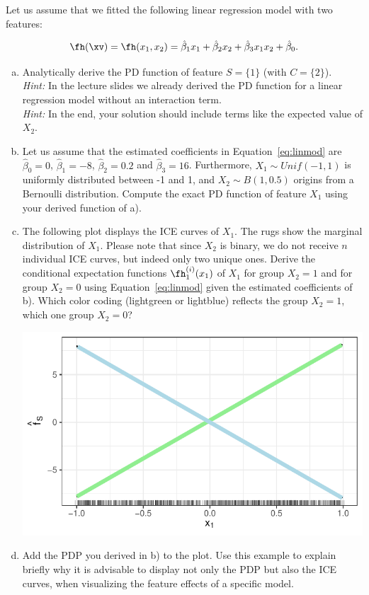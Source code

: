 Let us assume that we fitted the following linear regression model with two features: 

\begin{equation}
  \fh(\xv) = \fh(x_1, x_2) = \hat\beta_1 x_1 + \hat\beta_2 x_2 + \hat\beta_3 x_1 x_2 + \hat\beta_0.
  \label{eq:linmod}
\end{equation}


\begin{enumerate}[a)]
  \item Analytically derive the PD function of feature $S = \{1\}$ (with $C = \{2\}$).\\
  \textit{Hint:} In the lecture slides we already derived the PD function for a
  linear regression model without an interaction term.\\
  \textit{Hint:} In the end, your solution should include terms like the expected value of $X_2$.
  \item Let us assume that the estimated coefficients in Equation~\ref{eq:linmod}
  are $\hat\beta_0 = 0$, $\hat\beta_1 = -8$, $\hat\beta_2 = 0.2$ and $\hat\beta_3 = 16$.
  Furthermore, $X_1 \sim Unif(-1, 1)$ is uniformly distributed between -1 and 1, 
  and $X_2 \sim B(1, 0.5)$ origins from a Bernoulli distribution. 
  Compute the exact PD function of feature $X_1$ using your derived function of a).
  \item The following plot displays the ICE curves of $X_1$. The rugs show the marginal distribution of $X_1$. 
  Please note that since $X_2$ is binary, we do not receive $n$ individual ICE curves, but indeed 
  only two unique ones. 
  Derive the conditional expectation functions $\fh_1^{(i)}(x_1)$ of $X_1$ for group $X_2 = 1$ and for group $X_2 = 0$ using Equation~\ref{eq:linmod} given the estimated coefficients of b). 
  Which color coding (lightgreen or lightblue) reflects the group $X_2 = 1$, which one group $X_2 = 0$?

\begin{center}
\begin{knitrout}
\color{fgcolor}
\includegraphics[width=\maxwidth]{figure/fig-1-ex-pdpinteractions-1} 
\end{knitrout}
\end{center}

\item Add the PDP you derived in b) to the plot. 
  Use this example to explain briefly why it is advisable to display not only the PDP but also the ICE curves, 
  when visualizing the feature effects of a specific model. 

\end{enumerate}
